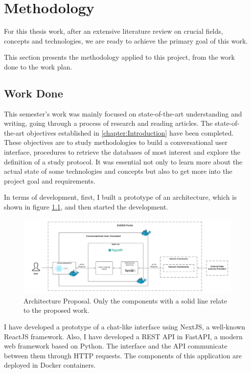 \chapter{Methodology}
\label{chapter:Methodology}

For this thesis work, after an extensive literature review on crucial fields, concepts and technologies, we are ready to achieve the primary goal of this work.

This section presents the methodology applied to this project, from the work done to the work plan.

\section{Work Done}

This semester's work was mainly focused on state-of-the-art understanding and writing, going through a process of research and reading articles. The state-of-the-art objectives established in \autoref{chapter:Introduction} have been completed. These objectives are to study methodologies to build a conversational user interface, procedures to retrieve the databases of most interest and explore the definition of a study protocol. It was essential not only to learn more about the actual state of some technologies and concepts but also to get more into the project goal and requirements.

In terms of development, first, I built a prototype of an architecture, which is shown in figure \ref{fig_arch}, and then started the development.

\begin{figure}[ht]
    \includegraphics[width=16cm]{figs/methodology/arquitetura.png}
    \centering
    \caption{Architecture Proposal. Only the components with a solid line relate to the proposed work.}
    \label{fig_arch}
\end{figure}

I have developed a prototype of a chat-like interface using NextJS, a well-known ReactJS framework. Also, I have developed a REST API in FastAPI, a modern web framework based on Python. The interface and the API communicate between them through HTTP requests. The components of this application are deployed in Docker containers.


